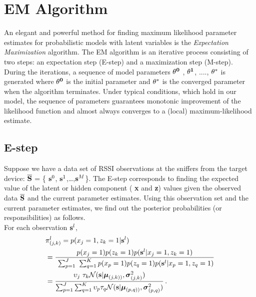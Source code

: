 \section{EM Algorithm}
\label{sec:emalgorithm}

An elegant and powerful method for finding maximum likelihood parameter estimates
for probabilistic models with latent variables is the \emph{Expectation Maximization} 
	algorithm. The EM algorithm is an iterative process consisting of two
	steps: an expectation step (E-step) and a maximization step (M-step). During the iterations, a sequence of model parameters ${\bf \theta^{0}}$
, ${\bf \theta^{1}}$, ...., ${\bf \theta^{*}}$ is generated where ${\bf \theta^{0}}$ is the initial parameter and ${\bf \theta^{*}}$ is the converged parameter when the algorithm terminates. Under typical conditions, which hold in our model, the sequence of parameters guarantees monotonic improvement of the likelihood function and almost always converges to a (local) maximum-likelihood estimate.

\subsection{E-step}
\label{subsec:estep}

Suppose we have a data set of RSSI observations at
the sniffers from the target device: ${\bf \overline{S}}$ = \{
${\bf {s}}^{0}$, ${\bf {s}}^{1}$,\ldots,${\bf {s}}^{M}$\}. The E-step
corresponds to finding the expected value of the latent or hidden component ({\bf
		x} and {\bf z}) values given the observed data  ${\bf \overline{S}}$ and the current parameter estimates.
Using this observation set and the current parameter estimates, we find out the posterior probabilities (or responsibilities) as follows. \\

\noindent For each observation ${\bf {s}}^{l}$,
\begin{align}
& \pi_{(j,k)}^{l}  = p({x_{j}} = 1, {z_{k}} = 1 | {\bf{s}}^{l}) \\ 
& = \frac { p({x_{j}} = 1)p({z_{k}} = 1)p( {\bf {s}}^{l} | {x_{j}} = 1, {z_{k}} = 1)} {\ \sum_{p=1}^J \ \sum_{q=1}^{K} p({x_{p}} = 1) p({z_{q}} = 1) p( {\bf {s}}^{l} | {x_{p}} = 1, {z_{q}} = 1)} \nonumber \\ 
& = \frac { \upsilon_{j} \ \tau_{k} \mathcal{N}(\mathbf{s} |  \boldsymbol\mu_{(j,k))},\boldsymbol\sigma_{(j,k)}^2)} {\sum_{p=1}^J \sum_{q=1}^K \upsilon_{p} \tau_{q} \mathcal{N}(\mathbf{s} |  \boldsymbol\mu_{(p,q))},\boldsymbol\sigma_{(p,q)}^2) } \, . 
\end{align}

